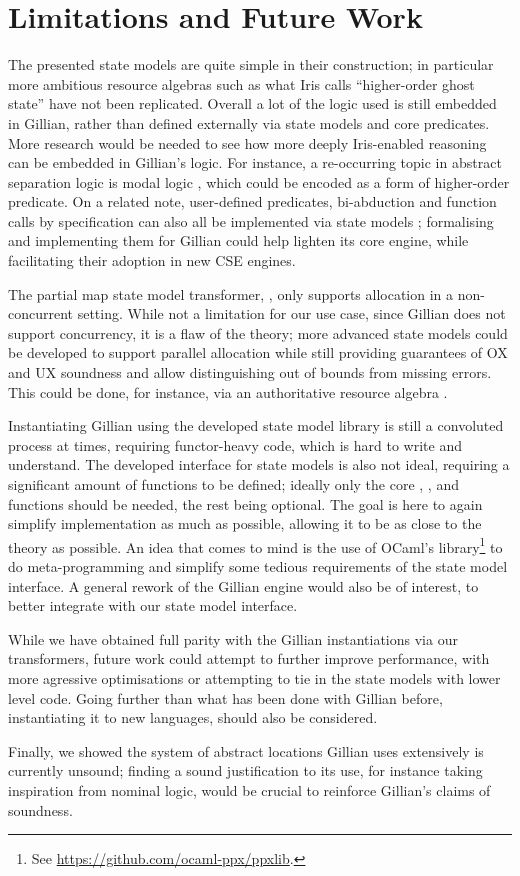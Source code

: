 \section{Limitations and Future Work}

The presented state models are quite simple in their construction; in particular more ambitious resource algebras such as what Iris calls ``higher-order ghost state'' \cite{iris} have not been replicated. Overall a lot of the logic used is still embedded in Gillian, rather than defined externally via state models and core predicates. More research would be needed to see how more deeply Iris-enabled reasoning can be embedded in Gillian's logic. For instance, a re-occurring topic in abstract separation logic is modal logic \cite{higherorderseplogic,iris,statesoundness}, which could be encoded as a form of higher-order predicate. On a related note, user-defined predicates, bi-abduction and function calls by specification can also all be implemented via state models \cite{sacha-phd}; formalising and implementing them for Gillian could help lighten its core engine, while facilitating their adoption in new CSE engines.

The partial map state model transformer, \PMap, only supports allocation in a non-concurrent setting. While not a limitation for our use case, since Gillian does not support concurrency, it is a flaw of the theory; more advanced state models could be developed to support parallel allocation while still providing guarantees of OX and UX soundness and allow distinguishing out of bounds from missing errors. This could be done, for instance, via an authoritative resource algebra \cite{iris}.

Instantiating Gillian using the developed state model library is still a convoluted process at times, requiring functor-heavy code, which is hard to write and understand. The developed interface for state models is also not ideal, requiring a significant amount of functions to be defined; ideally only the core \execac, \consume, \produce{} and \fix{} functions should be needed, the rest being optional. The goal is here to again simplify implementation as much as possible, allowing it to be as close to the theory as possible. An idea that comes to mind is the use of OCaml's  library\footnote{See \url{https://github.com/ocaml-ppx/ppxlib}.} to do meta-programming and simplify some tedious requirements of the state model interface. A general rework of the Gillian engine would also be of interest, to better integrate with our state model interface.

While we have obtained full parity with the Gillian instantiations via our transformers, future work could attempt to further improve performance, with more agressive optimisations or attempting to tie in the state models with lower level code. Going further than what has been done with Gillian before, instantiating it to new languages, should also be considered.

Finally, we showed the system of abstract locations Gillian uses extensively is currently unsound; finding a sound justification to its use, for instance taking inspiration from nominal logic, would be crucial to reinforce Gillian's claims of soundness.
